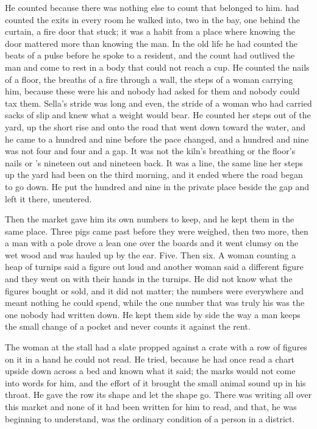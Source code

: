 He counted because there was nothing else to count that belonged to him.  had counted the exits in every room he walked into, two in the bay, one behind the curtain, a fire door that stuck; it was a habit from a place where knowing the door mattered more than knowing the man. In the old life he had counted the beats of a pulse before he spoke to a resident, and the count had outlived the man and come to rest in a body that could not reach a cup. He counted the nails of a floor, the breaths of a fire through a wall, the steps of a woman carrying him, because these were his and nobody had asked for them and nobody could tax them. Sella's stride was long and even, the stride of a woman who had carried sacks of slip and knew what a weight would bear. He counted her steps out of the yard, up the short rise and onto the road that went down toward the water, and he came to a hundred and nine before the pace changed, and a hundred and nine was not four and four and a gap. It was not the kiln's breathing or the floor's nails or 's nineteen out and nineteen back. It was a line, the same line her steps up the yard had been on the third morning, and it ended where the road began to go down. He put the hundred and nine in the private place beside the gap and left it there, unentered.

\scenebreak

Then the market gave him its own numbers to keep, and he kept them in the same place. Three pigs came past before they were weighed, then two more, then a man with a pole drove a lean one over the boards and it went clumsy on the wet wood and was hauled up by the ear. Five. Then six. A woman counting a heap of turnips said a figure out loud and another woman said a different figure and they went on with their hands in the turnips. He did not know what the figures bought or sold, and it did not matter; the numbers were everywhere and meant nothing he could spend, while the one number that was truly his was the one nobody had written down. He kept them side by side the way a man keeps the small change of a pocket and never counts it against the rent.

The woman at the stall had a slate propped against a crate with a row of figures on it in a hand he could not read. He tried, because he had once read a chart upside down across a bed and known what it said; the marks would not come into words for him, and the effort of it brought the small animal sound up in his throat. He gave the row its shape and let the shape go. There was writing all over this market and none of it had been written for him to read, and that, he was beginning to understand, was the ordinary condition of a person in a district.

